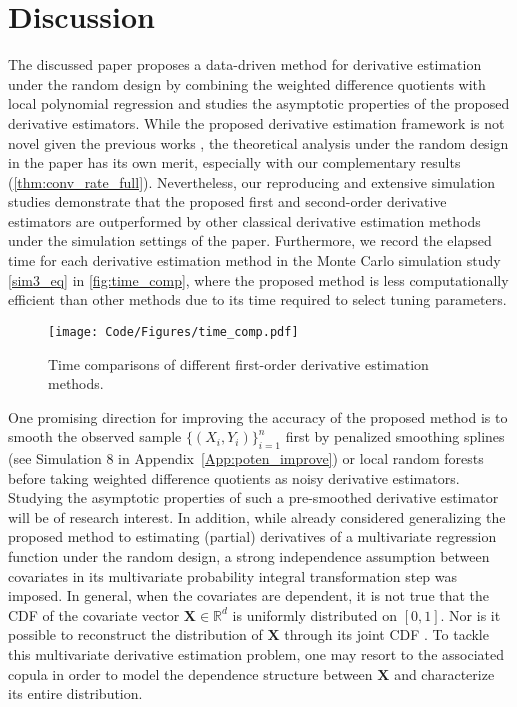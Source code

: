 \documentclass{uwstat572}
\theoremstyle{definition}
\theoremstyle{theorem}
\begin{document}

\section{Discussion}

The discussed paper \citep{liu2020smoothed} proposes a data-driven method for derivative estimation under the random design by combining the weighted difference quotients with local polynomial regression and studies the asymptotic properties of the proposed derivative estimators. While the proposed derivative estimation framework is not novel given the previous works \citep{de2013derivative,de2018local}, the theoretical analysis under the random design in the paper has its own merit, especially with our complementary results (\autoref{thm:conv_rate_full}). Nevertheless, our reproducing and extensive simulation studies demonstrate that the proposed first and second-order derivative estimators are outperformed by other classical derivative estimation methods under the simulation settings of the paper. Furthermore, we record the elapsed time for each derivative estimation method in the Monte Carlo simulation study \eqref{sim3_eq} in \autoref{fig:time_comp}, where the proposed method is less computationally efficient than other methods due to its time required to select tuning parameters.

\begin{wrapfigure}{r}{0.471\textwidth}
	\centering
	\texttt{[image: Code/Figures/time\_comp.pdf]}
	\caption{Time comparisons of different first-order derivative estimation methods.}
	\label{fig:time_comp}
\end{wrapfigure}

One promising direction for improving the accuracy of the proposed method is to smooth the observed sample $\{(X_i,Y_i)\}_{i=1}^n$ first by penalized smoothing splines (see Simulation 8 in Appendix~\ref{App:poten_improve}) or local random forests \citep{dang2021smoothed,dang2022machine} before taking weighted difference quotients as noisy derivative estimators. Studying the asymptotic properties of such a pre-smoothed derivative estimator will be of research interest. In addition, while \cite{dang2021smoothed} already considered generalizing the proposed method to estimating (partial) derivatives of a multivariate regression function under the random design, a strong independence assumption between covariates in its multivariate probability integral transformation step was imposed. In general, when the covariates are dependent, it is not true that the CDF of the covariate vector $\bm{X}\in \mathbb{R}^d$ is uniformly distributed on $[0,1]$. Nor is it possible to reconstruct the distribution of $\bm{X}$ through its joint CDF \citep{genest2001multivariate}. To tackle this multivariate derivative estimation problem, one may resort to the associated copula \citep{nelsen2007introduction} in order to model the dependence structure between $\bm{X}$ and characterize its entire distribution.
\end{document}
